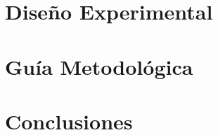 \documentclass[12pt, twoside]{report}
\begin{document}
\chapter{Diseño Experimental}
\label{cap:diseno-experimental}


\chapter{Guía Metodológica}
\label{cap:guia-metodologica}


\chapter{Conclusiones}
\label{cap:conclusiones}


%
%
%

%
%
%
%
%
%
%
%
%
%
%
%



\end{document}
